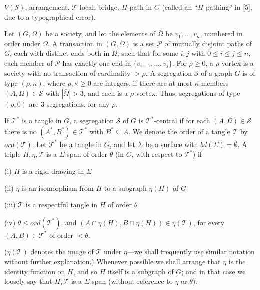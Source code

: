 \noindent $V(\mathscr{S})$, arrangement, $\mathscr{T}$-local, bridge, $H$-path in $G$ (called an ``$H$-pathing'' in [5], due to a typographical error).

Let $(G, \Omega)$ be a society, and let the elements of $\bar{\Omega}$ be $v_1, ..., v_n$, numbered in order under $\Omega$. A transaction in $(G, \Omega)$ is a set $\mathscr{P}$ of mutually disjoint paths of $G$, each with distinct ends both in $\bar{\Omega}$, such that for some $i, j$ with $0 \le i \le j \le n$, each member of $\mathscr{P}$ has exactly one end in $\{v_{i+1}, ..., v_j\}$. For $\rho \ge 0$, a $\rho$-vortex is a society with no transaction of cardinality $> \rho$. A segregation $\mathscr{S}$ of a graph $G$ is of type $(\rho, \kappa)$, where $\rho, \kappa \ge 0$ are integers, if there are at most $\kappa$ members $(A, \Omega) \in \mathscr{S}$ with $|\bar{\Omega}| > 3$, and each is a $\rho$-vortex. Thus, segregations of type $(\rho, 0)$ are 3-segregations, for any $\rho$.

If $\mathscr{T}^*$ is a tangle in $G$, a segregation $\mathscr{S}$ of $G$ is $\mathscr{T}^*$-central if for each $(A, \Omega) \in \mathscr{S}$ there is no $(A^*, B^*) \in \mathscr{T}^*$ with $B^* \subseteq A$. We denote the order of a tangle $\mathscr{T}$ by $ord(\mathscr{T})$. Let $\mathscr{T}^*$ be a tangle in $G$, and let $\Sigma$ be a surface with $bd(\Sigma) = \emptyset$. A triple $H, \eta, \mathscr{T}$ is a $\Sigma$-span of order $\theta$ (in $G$, with respect to $\mathscr{T}^*$) if

\hspace*{12pt}(i) $H$ is a rigid drawing in $\Sigma$

\hspace*{12pt}(ii) $\eta$ is an isomorphism from $H$ to a subgraph $\eta(H)$ of $G$

\hspace*{12pt}(iii) $\mathscr{T}$ is a respectful tangle in $H$ of order $\theta$

\hspace*{12pt}(iv) $\theta \le ord(\mathscr{T}^*)$, and $(A \cap \eta(H), B \cap \eta(H)) \in \eta(\mathscr{T})$, for every $(A, B) \in \mathscr{T}^*$ of order $< \theta$.

($\eta(\mathscr{T})$ denotes the image of $\mathscr{T}$ under $\eta$---we shall frequently use similar notation without further explanation.) Whenever possible we shall arrange that $\eta$ is the identity function on $H$, and so $H$ itself is a subgraph of $G$; and in that case we loosely say that $H, \mathscr{T}$ is a $\Sigma$-span (without reference to $\eta$ or $\theta$).

